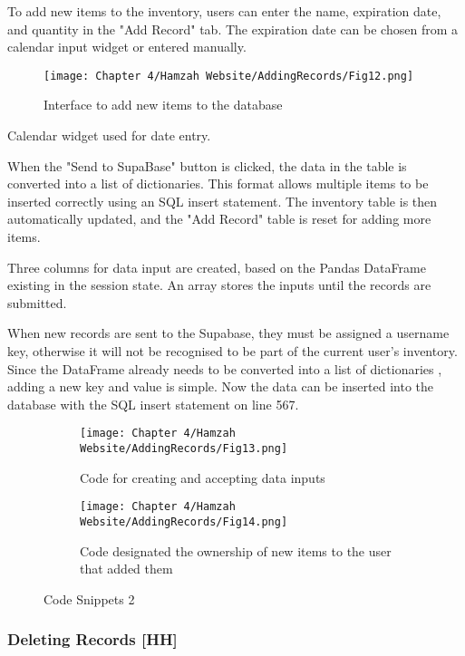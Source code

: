 To add new items to the inventory, users can enter the name, expiration date, and quantity in the "Add Record" tab.
The expiration date can be chosen from a calendar input widget or entered manually.

\begin{figure}[H]        
    \centering
    \texttt{[image: Chapter 4/Hamzah Website/AddingRecords/Fig12.png]}
    \caption{Interface to add new items to the database}
\end{figure} 

Calendar widget used for date entry.

When the "Send to SupaBase" button is clicked, the data in the table is converted into a list of dictionaries.
This format allows multiple items to be inserted correctly using an SQL insert statement.
The inventory table is then automatically updated, and the "Add Record" table is reset for adding more items.

Three columns for data input are created, based on the Pandas DataFrame existing in the session state.
An array stores the inputs until the records are submitted.

When new records are sent to the Supabase, they must be assigned a username key, otherwise it will not be recognised to be part of the current user's inventory.
Since the DataFrame already needs to be converted into a list of dictionaries , adding a new key and value is simple.
Now the data can be inserted into the database with the SQL insert statement on line 567.

\begin{figure}[H]
    \begin{subfigure}{.5\textwidth}
        \centering
        \texttt{[image: Chapter 4/Hamzah Website/AddingRecords/Fig13.png]}
        \caption{Code for creating and accepting data inputs}
    \end{subfigure}%
    \begin{subfigure}{.5\textwidth}
        \centering
        \texttt{[image: Chapter 4/Hamzah Website/AddingRecords/Fig14.png]}
        \caption{Code designated the ownership of new items to the user that added them}
    \end{subfigure}
    \caption{Code Snippets 2}
\end{figure}


\subsubsection{Deleting Records [HH]}

